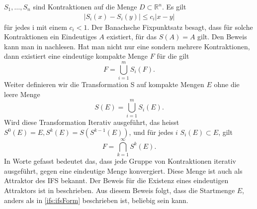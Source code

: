 $S_1,\dots,S_n$ sind Kontraktionen auf die Menge $D \subset \mathbb{R}^n$. Es gilt
\begin{align}
	|S_i(x) - S_i(y)| \leq c_i|x - y|
\end{align}
für jedes i mit einem $c_i < 1$.
Der Banachsche Fixpunktsatz besagt, dass für solche Kontraktionen ein Eindeutiges $A$ existiert, für das $S(A) = A$ gilt.
Den Beweis kann man in \cite{ifs:Rousseau2012} nachlesen.
Hat man nicht nur eine sondern mehrere Kontraktionen, dann existiert eine eindeutige kompakte Menge $F$ für die gilt
\begin{equation}
	F = \bigcup\limits_{i = 1}^{m} S_i(F).
\end{equation}
Weiter definieren wir die Transformation S auf kompakte Mengen $E$ ohne die leere Menge
\begin{equation}
	S(E) = \bigcup\limits_{i = 1}^m S_i(E).
	\label{ifs:transformation}
\end{equation}
Wird diese Transformation Iterativ ausgeführt, das heisst $S^0(E) = E, S^k(E) = S(S^{k-1}(E))$, und für jedes $i$ $S_i(E) \subset E$, gilt
\begin{equation}
	F = \bigcap\limits_{k = 1}^{\infty} S^k(E).
	\label{ifs:ifsForm}
\end{equation}
In Worte gefasst bedeutet das, dass jede Gruppe von Kontraktionen iterativ ausgeführt, gegen eine eindeutige Menge konvergiert.
Diese Menge ist auch als Attraktor des IFS bekannt.
Der Beweis für die Existenz eines eindeutigen Attraktors ist in \cite{ifs:fractal-geometry} beschrieben. 
Aus diesem Beweis folgt, dass die Startmenge $E$, anders als in \ref{ifs:ifsForm} beschrieben ist, beliebig sein kann.

